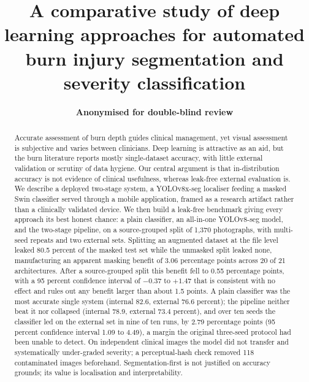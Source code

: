 \documentclass{elektr}
\title{A comparative study of deep learning approaches for automated burn injury segmentation and severity classification}
\author[ANONYMISED]{
	\textbf{Anonymised for double-blind review}\\
	\rec{...}
	\acc{...}
	\finv{...}
}
\begin{document}
\maketitle

\begin{abstract}
Accurate assessment of burn depth guides clinical management, yet visual assessment is subjective and varies between clinicians. Deep learning is attractive as an aid, but the burn literature reports mostly single-dataset accuracy, with little external validation or scrutiny of data hygiene. Our central argument is that in-distribution accuracy is not evidence of clinical usefulness, whereas leak-free external evaluation is. We describe a deployed two-stage system, a YOLOv8x-seg localiser feeding a masked Swin classifier served through a mobile application, framed as a research artifact rather than a clinically validated device. We then build a leak-free benchmark giving every approach its best honest chance: a plain classifier, an all-in-one YOLOv8-seg model, and the two-stage pipeline, on a source-grouped split of 1,370 photographs, with multi-seed repeats and two external sets. Splitting an augmented dataset at the file level leaked 80.5 percent of the masked test set while the unmasked split leaked none, manufacturing an apparent masking benefit of 3.06 percentage points across 20 of 21 architectures. After a source-grouped split this benefit fell to 0.55 percentage points, with a 95 percent confidence interval of $-0.37$ to $+1.47$ that is consistent with no effect and rules out any benefit larger than about 1.5 points. A plain classifier was the most accurate single system (internal 82.6, external 76.6 percent); the pipeline neither beat it nor collapsed (internal 78.9, external 73.4 percent), and over ten seeds the classifier led on the external set in nine of ten runs, by 2.79 percentage points (95 percent confidence interval 1.09 to 4.49), a margin the original three-seed protocol had been unable to detect. On independent clinical images the model did not transfer and systematically under-graded severity; a perceptual-hash check removed 118 contaminated images beforehand. Segmentation-first is not justified on accuracy grounds; its value is localisation and interpretability.
\end{abstract}
\end{document}
